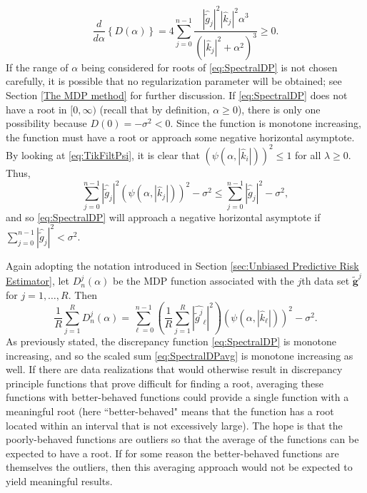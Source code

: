 \documentclass[12pt]{article}
\newcommand{\gnoise}{\widetilde{g}}	%
\newcommand{\gnoiseVec}{\widetilde{\mathbf{g}}}	%
\newcommand{\regparam}{\alpha}
\newcommand{\mfilt}{\psi}
\newcommand{\noiseSD}{\sigma}	%
\newcommand{\D}{D}	%
\begin{document}
\[\frac{d}{d\regparam}\left\{\D(\regparam)\right\} = 4\sum_{j = 0}^{n-1} \frac{|\widehat{\gnoise}_j|^2|\widehat{k}_j|^2\regparam^3}{\left(|\widehat{k}_j|^2 + \regparam^2\right)^3} \geq 0.\]
If the range of $\regparam$ being considered for roots of \eqref{eq:SpectralDP} is not chosen carefully, it is possible that no regularization parameter will be obtained; see Section \ref{The MDP method} for further discussion. If \eqref{eq:SpectralDP} does not have a root in $[0,\infty)$ (recall that by definition, $\regparam \geq 0$), there is only one possibility because $\D(0) = -\noiseSD^2 < 0$. Since the function is monotone increasing, the function must have a root or approach some negative horizontal asymptote. By looking at \eqref{eq:TikFiltPsi}, it is clear that $(\mfilt(\regparam,|\widehat{k}_i|))^2 \leq 1$ for all $\lambda \geq 0$. Thus,
\[\sum_{j = 0}^{n-1} |\widehat{\gnoise}_j|^2(\mfilt(\regparam,|\widehat{k}_j|))^2 - \noiseSD^2 \leq \sum_{j = 0}^{n-1} |\widehat{\gnoise}_j|^2 - \noiseSD^2,\]
and so \eqref{eq:SpectralDP} will approach a negative horizontal asymptote if $\sum_{j = 0}^{n-1} |\widehat{\gnoise}_j|^2 < \noiseSD^2$. \par 
Again adopting the notation introduced in Section \ref{sec:Unbiased Predictive Risk Estimator}, let $\D_n^j(\regparam)$ be the MDP function associated with the $j$th data set $\gnoiseVec^j$ for $j = 1,\ldots,R$. Then 
\begin{equation}
\frac{1}{R}\sum_{j=1}^R \D_n^j(\regparam)  = \sum_{\ell = 0}^{n-1} \left(\frac{1}{R} \sum_{j=1}^R |\widehat{\gnoise^j}_\ell|^2\right)(\mfilt(\regparam,|\widehat{k}_\ell|))^2 - \noiseSD^2. 
\label{eq:SpectralDPavg}
\end{equation}
As previously stated, the discrepancy function \eqref{eq:SpectralDP} is monotone increasing, and so the scaled sum \eqref{eq:SpectralDPavg} is monotone increasing as well. If there are data realizations that would otherwise result in discrepancy principle functions that prove difficult for finding a root, averaging these functions with better-behaved functions could provide a single function with a meaningful root (here ``better-behaved" means that the function has a root located within an interval that is not excessively large). The hope is that the poorly-behaved functions are outliers so that the average of the functions can be expected to have a root. If for some reason the better-behaved functions are themselves the outliers, then this averaging approach would not be expected to yield meaningful results. \par 
\end{document}
